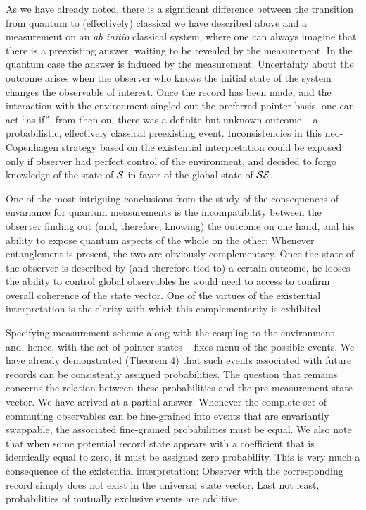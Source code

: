 \documentclass[aps,pra,epsfig,11pt,floatfix]{revtex4}
\begin{document}
As we have already noted, there is a significant difference between
the transition from quantum to (effectively) classical we have described
above and a measurement on an {\it ab initio} classical system, where one can
always imagine that there is a preexisting answer, waiting to be revealed by
the measurement. In the quantum case the answer is induced by the measurement:
Uncertainty about the outcome arises when the observer who knows the initial
state of the system changes the observable of interest. Once the record has
been made, and the interaction with the environment singled out the preferred
pointer basis, one can act ``as if'', from then on, there was a definite but
unknown outcome -- a probabilistic, effectively classical preexisting event.
Inconsistencies in this neo-Copenhagen strategy based on the existential
interpretation could be exposed only if observer had perfect control
of the environment, and decided to forgo knowledge of the
state of ${\cal S}$ in favor of the global state of ${\cal SE}$.

One of the most intriguing conclusions from the study of the consequences of
envariance for quantum measurements is the incompatibility between the observer
finding out (and, therefore, knowing) the outcome on one hand, and his ability
to expose quantum aspects of the whole on the other: Whenever entanglement is
present, the two are obviously
complementary. Once the state of the observer is described by (and therefore
tied to) a certain outcome, he looses the ability to control global observables
he would need to access to confirm overall coherence of the state vector.
One of the virtues of the existential interpretation is the clarity with which
this complementarity is exhibited.

Specifying measurement scheme along with the coupling to the environment
-- and, hence, with the set of pointer states -- fixes menu of the possible
events. We have already demonstrated (Theorem 4) that such events associated
with future records can be consistently assigned probabilities. The question
that remains concerns the relation between these probabilities and the
pre-measurement state vector. We have arrived at a partial answer:
Whenever the complete set of commuting observables can be fine-grained into
events that are envariantly swappable, the associated fine-grained
probabilities must be equal. We also note that when some potential record
state appears with a coefficient that is identically equal to zero, it must
be assigned zero probability. This is very much a consequence of the 
existential
interpretation: Observer with the corresponding record simply does not exist
in the universal state vector. Last not least, probabilities of mutually
exclusive events are additive.
\end{document}
